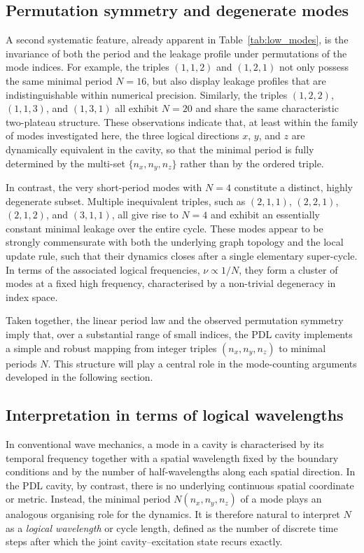 \documentclass{article}
\theoremstyle{definition}
\begin{document}
\subsection{Permutation symmetry and degenerate modes}

A second systematic feature, already apparent in Table~\ref{tab:low_modes}, is the invariance of both the period and the leakage profile under permutations of the mode indices.\cite{Effective_Fields_PDL_2026} For example, the triples $(1,1,2)$ and $(1,2,1)$ not only possess the same minimal period $N = 16$, but also display leakage profiles that are indistinguishable within numerical precision. Similarly, the triples $(1,2,2)$, $(1,1,3)$, and $(1,3,1)$ all exhibit $N = 20$ and share the same characteristic two-plateau structure.\cite{Effective_Fields_PDL_2026} These observations indicate that, at least within the family of modes investigated here, the three logical directions $x$, $y$, and $z$ are dynamically equivalent in the cavity, so that the minimal period is fully determined by the multi-set $\{n_x,n_y,n_z\}$ rather than by the ordered triple.

In contrast, the very short-period modes with $N=4$ constitute a distinct, highly degenerate subset. Multiple inequivalent triples, such as $(2,1,1)$, $(2,2,1)$, $(2,1,2)$, and $(3,1,1)$, all give rise to $N=4$ and exhibit an essentially constant minimal leakage over the entire cycle.\cite{Effective_Fields_PDL_2026} These modes appear to be strongly commensurate with both the underlying graph topology and the local update rule, such that their dynamics closes after a single elementary super-cycle. In terms of the associated logical frequencies, $\nu \propto 1/N$, they form a cluster of modes at a fixed high frequency, characterised by a non-trivial degeneracy in index space.

Taken together, the linear period law and the observed permutation symmetry imply that, over a substantial range of small indices, the PDL cavity implements a simple and robust mapping from integer triples $(n_x,n_y,n_z)$ to minimal periods $N$. This structure will play a central role in the mode-counting arguments developed in the following section.

\subsection{Interpretation in terms of logical wavelengths}

In conventional wave mechanics, a mode in a cavity is characterised by its temporal frequency together with a spatial wavelength fixed by the boundary conditions and by the number of half-wavelengths along each spatial direction.\cite{EM_Cavities_Notes,Density_of_states_Notes} In the PDL cavity, by contrast, there is no underlying continuous spatial coordinate or metric. Instead, the minimal period $N(n_x,n_y,n_z)$ of a mode plays an analogous organising role for the dynamics. It is therefore natural to interpret $N$ as a \emph{logical wavelength} or cycle length, defined as the number of discrete time steps after which the joint cavity–excitation state recurs exactly.
\end{document}
